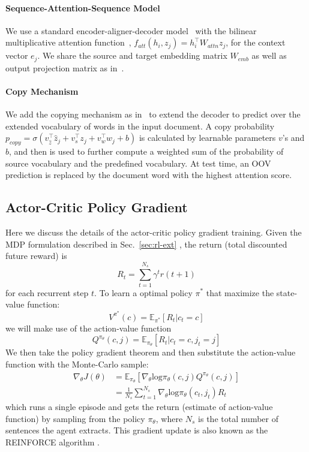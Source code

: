 \documentclass[11pt,a4paper]{article}
\def\secref#1{Sec.~\ref{#1}}
\begin{document}
\paragraph{Sequence-Attention-Sequence Model}
We use a standard encoder-aligner-decoder model~\cite{bahdanau+al-2014-nmt,luong-pham-manning:2015:EMNLP} with the bilinear multiplicative attention function~\cite{luong-pham-manning:2015:EMNLP}, 
$f_{att}(h_i, z_j) = h_i^\top W_{attn}z_j $, for the context vector $e_j$.
We share the source and target embedding matrix $W_{emb}$ as well as output projection matrix as in~\citet{DBLP:journals/corr/InanKS16,E17-2025:output_embedding,DBLP:journals/corr/PaulusXS17}. 


\paragraph{Copy Mechanism}
We add the copying mechanism as in~\citet{get_to_the_point} to
extend the decoder to predict over
 the extended vocabulary of words in the input document.
A copy probability 
$p_{copy} = 
\sigma (v_{\hat{z}}^\top\hat{z}_j
+ v_s^\top z_j
+ v_w^\top w_j + b) $  
is calculated by learnable parameters $v$'s and $b$, and then is used to further compute 
a weighted sum of the probability of source vocabulary and the predefined vocabulary.
At test time, an OOV prediction is replaced by the document word with the highest 
attention score.

\subsection{Actor-Critic Policy Gradient}
\label{sec:pg}
Here we discuss the details of the actor-critic policy gradient training.
Given the MDP formulation described in \secref{sec:rl-ext}
, the return (total discounted future reward) is
\begin{equation}
\label{eq:tot-return}
R_t = \sum_{t=1}^{N_s}\gamma^{t}r(t+1)
\end{equation}
for each recurrent step $t$.
To learn a optimal policy $\pi^*$ that maximize the state-value function:
$$
V^{\pi^*}(c) =  \mathbb{E}_{\pi^*}[R_t | c_t = c]
$$
we will make use of the action-value function
$$
Q^{\pi_{\theta}}(c, j) =  \mathbb{E}_{\pi_{\theta}}
[R_t | c_t = c, j_t = j]
$$
We then take the policy gradient theorem and then substitute the action-value function with the Monte-Carlo sample:
\begin{align}
\nabla_{\theta} J(\theta) &= 
\mathbb{E}_{\pi_\theta}[
\nabla_\theta \text{log} \pi_\theta(c, j) Q^{\pi_\theta}(c, j)] \label{eq:policy_gradient_theorem}\\
&= \frac{1}{N_s} \sum_{t=1}^{N_s}\nabla_\theta \text{log} \pi_\theta(c_t, j_t) R_t
\end{align}
which runs a single episode and gets the return (estimate of action-value function) by sampling from the policy $\pi_\theta$, 
where $N_s$ is the total number of sentences the agent extracts.
This gradient update is also known as the REINFORCE algorithm \citep{Williams:1992:SSG:139611.139614}.
\end{document}
